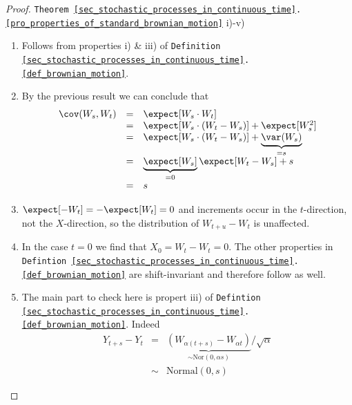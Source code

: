 \documentclass[11pt,a4paper]{article}
\begin{document}
  \begin{proof}{\texttt{Theorem \ref{sec_stochastic_processes_in_continuous_time}.\ref{pro_properties_of_standard_brownian_motion}} i)-v)}
    \begin{enumerate}
      \item Follows from properties i) \& iii) of \texttt{Definition \ref{sec_stochastic_processes_in_continuous_time}.\ref{def_brownian_motion}}.
      \item By the previous result we can conclude that
      \[\begin{array}{rcl}
        \cov(W_s,W_t)&=&\expect[W_s\cdot W_t]\\
        &=&\expect[W_s\cdot(W_t-W_s)]+\expect[W_s^2]\\
        &=&\expect[W_s\cdot(W_t-W_s)]+\underbrace{\var(W_s)}_{=s}\\
        &=&\underbrace{\expect[W_s]}_{=0}\expect[W_t-W_s]+s\\
        &=&s
      \end{array}\]
      \item $\expect[-W_t]=-\expect[W_t]=0$ and increments occur in the $t$-direction, not the $X$-direction, so the distribution of $W_{t+u}-W_t$ is unaffected.
      \item In the case $t=0$ we find that $X_0=W_t-W_t=0$. The other properties in \texttt{Defintion \ref{sec_stochastic_processes_in_continuous_time}.\ref{def_brownian_motion}} are shift-invariant and therefore follow as well.
      \item The main part to check here is propert iii) of \texttt{Defintion \ref{sec_stochastic_processes_in_continuous_time}.\ref{def_brownian_motion}}. Indeed
      \[\begin{array}{rcl}
        Y_{t+s}-Y_t&=&\underbrace{(W_{\alpha(t+s)}-W_{\alpha t})}_{\sim\text{Nor}(0,\alpha s)}/\sqrt{\alpha}\\
        &\sim&\text{Normal}(0,s)
      \end{array}\]
    \end{enumerate}
    \proved
  \end{proof}
\end{document}
